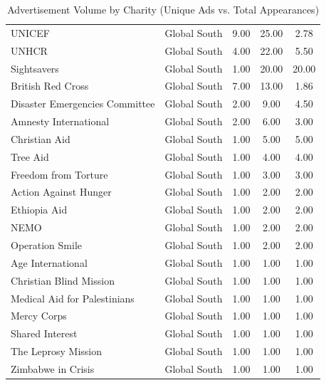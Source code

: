 \begin{table}[ht]
{\begin{tabular}{p{5cm}cccc}
  UNICEF & Global South & 9.00 & 25.00 & 2.78 \\ 
  UNHCR & Global South & 4.00 & 22.00 & 5.50 \\ 
  Sightsavers & Global South & 1.00 & 20.00 & 20.00 \\ 
  British Red Cross & Global South & 7.00 & 13.00 & 1.86 \\ 
  Disaster Emergencies Committee & Global South & 2.00 & 9.00 & 4.50 \\ 
  Amnesty International & Global South & 2.00 & 6.00 & 3.00 \\ 
  Christian Aid & Global South & 1.00 & 5.00 & 5.00 \\ 
  Tree Aid & Global South & 1.00 & 4.00 & 4.00 \\ 
  Freedom from Torture & Global South & 1.00 & 3.00 & 3.00 \\ 
  Action Against Hunger & Global South & 1.00 & 2.00 & 2.00 \\ 
  Ethiopia Aid & Global South & 1.00 & 2.00 & 2.00 \\ 
  NEMO & Global South & 1.00 & 2.00 & 2.00 \\ 
  Operation Smile & Global South & 1.00 & 2.00 & 2.00 \\ 
  Age International & Global South & 1.00 & 1.00 & 1.00 \\ 
  Christian Blind Mission & Global South & 1.00 & 1.00 & 1.00 \\ 
  Medical Aid for Palestinians & Global South & 1.00 & 1.00 & 1.00 \\ 
  Mercy Corps & Global South & 1.00 & 1.00 & 1.00 \\ 
  Shared Interest & Global South & 1.00 & 1.00 & 1.00 \\ 
  The Leprosy Mission & Global South & 1.00 & 1.00 & 1.00 \\ 
  Zimbabwe in Crisis & Global South & 1.00 & 1.00 & 1.00 \\ 
   \hline
\end{tabular}
}
\caption{Advertisement Volume by Charity (Unique Ads vs. Total Appearances)} 
\end{table}
